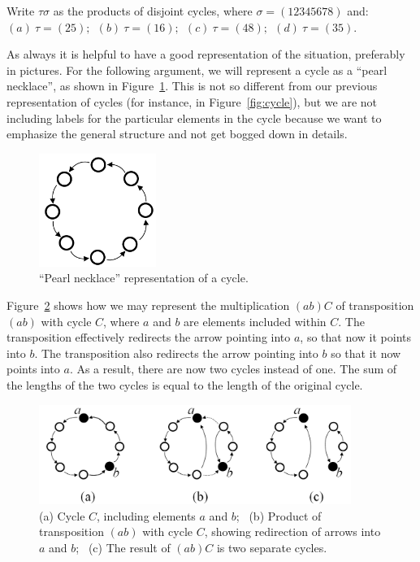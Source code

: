 \begin{exercise}{}
Write $\tau \sigma$  as the products of disjoint cycles, where $\sigma = (12345678)$ and:
$(a)~\tau= (25);~~ (b)~\tau= (16);~~ (c)~\tau=(48) ;~~ (d)~\tau=(35)$.
\end{exercise}


As always it is helpful to have a good representation of the situation, preferably in pictures. For the following argument, we will represent a cycle as a ``pearl necklace'', as shown in Figure~\ref{fig:pearl}. This is not so different from our previous representation of cycles (for instance, in Figure~\ref{fig:cycle}), but we are not including labels for the particular elements in the cycle because we want to emphasize the general structure and not get bogged down in details. 

\begin{figure}[ht]
\begin{center}
\includegraphics[width=1.5in]{images/pearl_necklace.png}
\caption{``Pearl necklace'' representation of a cycle.}\label{fig:pearl}
\end{center}
\end{figure}


Figure~\ref{fig:abC} shows how we may represent the multiplication $(ab)C$ of transposition $(ab)$ with cycle $C$, where $a$ and $b$ are elements included within $C$. The transposition effectively redirects the arrow pointing into $a$, so that now it points into $b$. The transposition also redirects the arrow pointing into $b$ so that it now points into $a$. As a result, there are now two cycles instead of one. The sum of the lengths of the two cycles is equal to the length of the original cycle.

\begin{figure}[ht]
\begin{center}
\includegraphics[width=4in]{images/abC.png}
\caption{(a) Cycle $C$, including elements $a$ and $b$;~ (b) Product of transposition $(ab)$ with cycle $C$, showing redirection of arrows into $a$ and $b$;~ (c) The result of $(ab)C$ is two separate cycles.}\label{fig:abC}
\end{center}
\end{figure}

